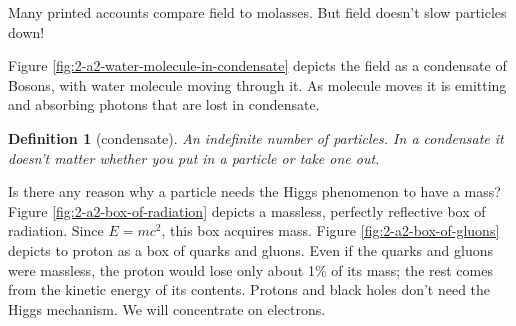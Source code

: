 \documentclass[]{article}
\newtheorem{defn}[thm]{Definition}
\begin{document}
\begin{appendices}
	Many printed accounts compare field to molasses. But field doesn't slow particles down! 

	Figure \ref{fig:2-a2-water-molecule-in-condensate} depicts the field as a condensate of Bosons, with water molecule moving through it. As molecule moves it is emitting and absorbing photons that are lost in condensate.
	
	\begin{defn}[condensate]
		An indefinite number of particles. In a condensate it doesn't matter whether you put in a particle or take one out.
	\end{defn}

	Is there any reason why a particle needs the Higgs phenomenon to have a  mass? Figure \ref{fig:2-a2-box-of-radiation} depicts a massless, perfectly reflective box of radiation. Since $E=mc^2$, this box acquires mass. Figure \ref{fig:2-a2-box-of-gluons} depicts to proton as a box of quarks and gluons. Even if the quarks and gluons were massless, the proton would lose only about 1\% of its mass; the rest comes from the kinetic energy of its contents. Protons and black holes don't need the Higgs mechanism. We will concentrate on electrons.
	

\end{appendices}
\end{document}
